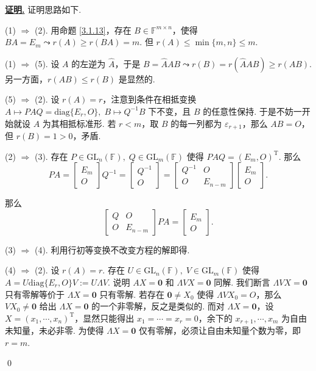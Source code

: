 \documentclass[10pt,openany]{article}
\theoremstyle{thmstyle} %
\theoremstyle{defstyle} %
\theoremstyle{prostyle} %
\theoremstyle{exastyle}
\theoremstyle{remstyle}
\renewenvironment{proof}[1][证明]{\par\underline{\textbf{#1.}} \;\fangsong}{\qed\par}
\newcommand{\T}{^{\text{T}}}
\newcommand{\F}{\mathbb{F}}
\newcommand{\gfn}{\text{GL}_n(\mathbb{F})}
\newcommand{\gfm}{\text{GL}_m(\mathbb{F})}
\newcommand{\mn}{^{m \times n}}
\newcommand{\diag}{\mathrm{diag}}
\begin{document}
\begin{proof}
	 证明思路如下.
	 \begin{center}
	 \end{center}
	 
	
	 (1) \( \Rightarrow \) (2). 用命题 \ref{3.1.13}，存在 \( B \in \F\mn \)，使得 \( BA=E_m \leadsto r(A) \geq r(BA)=m \). 但 \( r(A) \leq \min\{m,n\} \leq m \). 
	 
	 (1) \( \Rightarrow \) (5). 设 \( A \) 的左逆为 \( \hat{A} \)，于是 \( B=\hat{A}AB \leadsto r(B)=r(\hat{A}AB) \geq r(AB) \). 另一方面，\( r(AB) \leq r(B) \) 是显然的.
	 
	 (5) \( \Rightarrow \) (2). 设 \( r(A)=r \)，注意到条件在相抵变换 \( A \mapsto PAQ=\diag\{E_r,O\}, \; B \mapsto Q^{-1}B \) 下不变，且 \( B \) 的任意性保持. 于是不妨一开始就设 \( A \) 为其相抵标准形. 若 \( r<m \)，取 \( B \) 的每一列都为 \( \varepsilon_{r+1} \)，那么 \( AB=O \)，但 \( r(B)=1>0 \)，矛盾.
	 
	 (2) \( \Rightarrow \) (3). 存在 \( P \in \gfn, \; Q \in \gfm \) 使得 \( PAQ=(E_m,O)\T \). 那么 
	 \[ PA= \begin{bmatrix}
	 	E_m \\ O
	 \end{bmatrix}Q^{-1}=\begin{bmatrix}
	 Q^{-1} \\ O
	 \end{bmatrix}=\begin{bmatrix}
	 Q^{-1} & O \\
	 O & E_{n-m}
	 \end{bmatrix}\begin{bmatrix}
	 E_m \\ O
	 \end{bmatrix}. \]
	 
	 那么
	 \[ \begin{bmatrix}
	 	Q & O \\
	 	O & E_{n-m}
	 \end{bmatrix}PA=\begin{bmatrix}
	 E_m \\ O
	 \end{bmatrix}.  \]
	 
	 (3) \( \Rightarrow \) (4). 利用行初等变换不改变方程的解即得. 
	 
	 (4) \( \Rightarrow \) (2). 设 \( r(A)=r \). 存在 \( U \in \gfn, \; V \in \gfm \) 使得 \( A=U\diag\{E_r,O\}V:=U\Lambda V \). 说明 \( AX=\bm{0} \) 和 \( \Lambda VX=\bm{0} \) 同解. 我们断言 \( \Lambda VX=\bm{0} \) 只有零解等价于 \( \Lambda X=\bm{0} \) 只有零解. 若存在 \( \bm{0} \neq X_0 \) 使得 \( \Lambda VX_0=O \)，那么 \( VX_0 \neq \bm{0} \) 给出 \( \Lambda X=\bm{0} \) 的一个非零解，反之是类似的. 而对 \( \Lambda X=\bm{0} \)，设 \( X=(x_1,\cdots,x_n)\T \)，显然只能得出 \( x_1=\cdots=x_r=0 \)，余下的 \( x_{r+1},\cdots,x_m \) 为自由未知量，未必非零. 为使得 \( \Lambda X=\bm{0} \) 仅有零解，必须让自由未知量个数为零，即 \( r=m \). 
	 

\end{proof}
\end{document}
